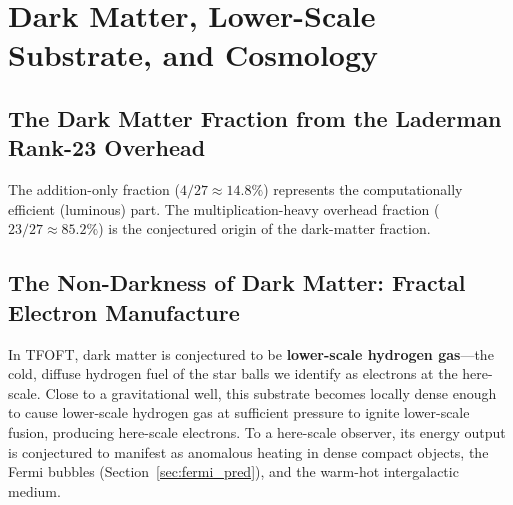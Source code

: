 \documentclass[11pt,a4paper]{article}
\begin{document}

\section{Dark Matter, Lower-Scale Substrate, and Cosmology}


\subsection{The Dark Matter Fraction from the Laderman Rank-23 Overhead}
\label{sec:dm}

The addition-only fraction ($4/27 \approx 14.8\%$) represents the computationally efficient (luminous) part. The multiplication-heavy overhead fraction ($23/27 \approx 85.2\%$) is the conjectured origin of the dark-matter fraction.


\subsection{The Non-Darkness of Dark Matter: Fractal Electron Manufacture}

In TFOFT, dark matter is conjectured to be \textbf{lower-scale hydrogen gas}---the cold, diffuse hydrogen fuel of the star balls we identify as electrons at the here-scale. Close to a gravitational well, this substrate becomes locally dense enough to cause lower-scale hydrogen gas at sufficient pressure to ignite lower-scale fusion, producing here-scale electrons. To a here-scale observer, its energy output is conjectured to manifest as anomalous heating in dense compact objects, the Fermi bubbles (Section~\ref{sec:fermi_pred}), and the warm-hot intergalactic medium.
\end{document}
